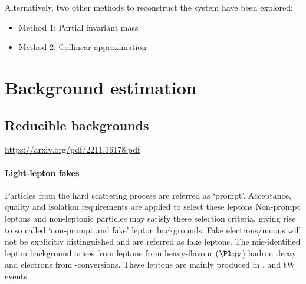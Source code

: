 

Alternatively, two other methods to reconstruct the \tautau system have been explored:
\begin{itemize}
	\item Method 1: Partial invariant mass
	\item Method 2: Collinear approximation
\end{itemize}


\section{Background estimation}
\label{sec:ChaptH:Bkg}





\subsection{Reducible backgrounds}
\label{sec:ChaptH:Bkg:Fakes}
\url{https://arxiv.org/pdf/2211.16178.pdf}




\paragraph{Light-lepton fakes} %

Particles from the hard scattering process are referred as `prompt'. 
Acceptance, quality and isolation requirements are applied to select these leptons
Non-prompt leptons and non-leptonic particles may satisfy these selection criteria, 
giving rise to so called `non-prompt and fake' lepton backgrounds.
Fake electrons/muons will not be explicitly distinguished and are referred as fake leptons.
The mis-identified lepton background arises from leptons from heavy-flavour 
($\Pl_{\text{HF}}$) hadron decay and electrons from \Pgamma-conversions.
These leptons are mainly produced in \ttbar, \Zjets and tW events.

